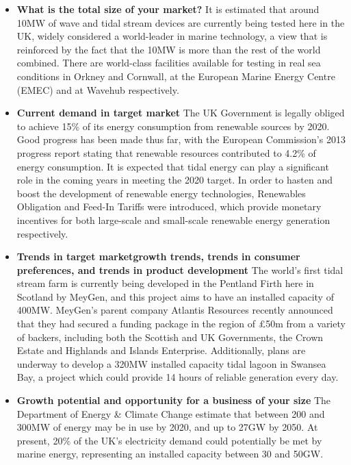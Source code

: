 \documentclass[a4paper,11pt]{article}
\begin{document}
\begin{itemize}
	\item \textbf{What is the total size of your market?} It is estimated that around 10MW of wave and tidal stream devices are currently being tested here in the UK\cite{f1}, widely considered a world-leader in marine technology, a view that is reinforced by the fact that the 10MW is more than the rest of the world combined. There are world-class facilities available for testing in real sea conditions in Orkney and Cornwall, at the European Marine Energy Centre (EMEC) and at Wavehub respectively.

	\item \textbf{Current demand in target market} The UK Government is legally obliged to achieve 15\% of its energy consumption from renewable sources by 2020\cite{f3}. Good progress has been made thus far, with the European Commission's 2013 progress report stating that renewable resources contributed to 4.2\% of energy consumption\cite{f4}. It is expected that tidal energy can play a significant role in the coming years in meeting the 2020 target. In order to hasten and boost the development of renewable energy technologies, Renewables Obligation and Feed-In Tariffs were introduced, which provide monetary incentives for both large-scale and small-scale renewable energy generation respectively.
	
	\item \textbf{Trends in target market\textemdash growth trends, trends in consumer preferences, and trends in product development} The world's first tidal stream farm is currently being developed in the Pentland Firth here in Scotland by MeyGen, and this project aims to have an installed capacity of 400MW\cite{f5}. MeyGen’s parent company Atlantis Resources recently announced that they had secured a funding package in the region of £50m from a variety of backers, including both the Scottish and UK Governments, the Crown Estate and Highlands and Islands Enterprise\cite{f6}. Additionally, plans are underway to develop a 320MW installed capacity tidal lagoon in Swansea Bay, a project which could provide 14 hours of reliable generation every day\cite{f7}.
	
	\item \textbf{Growth potential and opportunity for a business of your size} The Department of Energy \& Climate Change estimate that between 200 and 300MW of energy may be in use by 2020, and up to 27GW by 2050\cite{f8}. At present, 20\% of the UK's electricity demand could potentially be met by marine energy, representing an installed capacity between 30 and 50GW.
	

\end{itemize}
\end{document}
